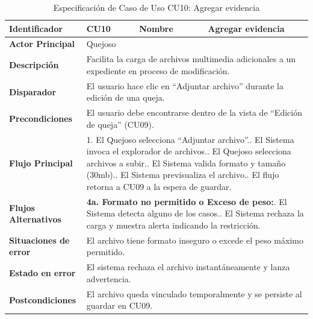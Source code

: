\vspace{0.8cm}

\begingroup
\setlength{\parskip}{0pt}
\begin{longtable}{|p{3.5cm}|p{2cm}|p{2.5cm}|p{7cm}|}
\caption{Especificación de Caso de Uso CU10: Agregar evidencia}
\label{tab:cu10_agregar_evidencia} \\
\hline
\textbf{Identificador} & CU10 & \textbf{Nombre} & Agregar evidencia \\ \hline
\textbf{Actor Principal} & \multicolumn{3}{p{11.5cm}|}{Quejoso} \\ \hline
\textbf{Descripción} & \multicolumn{3}{p{11.5cm}|}{Facilita la carga de archivos multimedia adicionales a un expediente en proceso de modificación.} \\ \hline
\textbf{Disparador} & \multicolumn{3}{p{11.5cm}|}{El usuario hace clic en ``Adjuntar archivo'' durante la edición de una queja.} \\ \hline
\textbf{Precondiciones} & \multicolumn{3}{p{11.5cm}|}{El usuario debe encontrarse dentro de la vista de ``Edición de queja'' (CU09).} \\ \hline
\textbf{Flujo Principal} & \multicolumn{3}{p{11.5cm}|}{1. El Quejoso selecciona ``Adjuntar archivo''.\newline 2. El Sistema invoca el explorador de archivos.\newline 3. El Quejoso selecciona archivos a subir.\newline 4. El Sistema valida formato y tamaño (30mb).\newline 5. El Sistema previsualiza el archivo.\newline 6. El flujo retorna a CU09 a la espera de guardar.} \\ \hline
\textbf{Flujos Alternativos} & \multicolumn{3}{p{11.5cm}|}{\textbf{4a. Formato no permitido o Exceso de peso:}\newline 1. El Sistema detecta alguno de los casos.\newline 2. El Sistema rechaza la carga y muestra alerta indicando la restricción.} \\ \hline
\textbf{Situaciones de error} & \multicolumn{3}{p{11.5cm}|}{El archivo tiene formato inseguro o excede el peso máximo permitido.} \\ \hline
\textbf{Estado en error} & \multicolumn{3}{p{11.5cm}|}{El sistema rechaza el archivo instantáneamente y lanza advertencia.} \\ \hline
\textbf{Postcondiciones} & \multicolumn{3}{p{11.5cm}|}{El archivo queda vinculado temporalmente y se persiste al guardar en CU09.} \\ \hline
\end{longtable}
\endgroup

